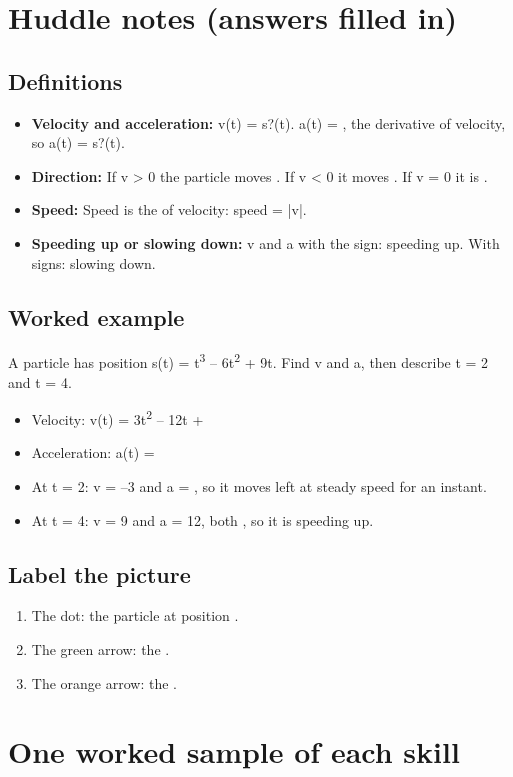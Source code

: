 \documentclass[11pt]{article}
\begin{document}
\section*{Huddle notes (answers filled in)}
\subsection*{Definitions}\begin{itemize}
\item \textbf{Velocity and acceleration:} v(t) = s?(t). a(t) = , the derivative of velocity, so a(t) = s?(t).
\item \textbf{Direction:} If v > 0 the particle moves . If v < 0 it moves . If v = 0 it is .
\item \textbf{Speed:} Speed is the  of velocity: speed = |v|.
\item \textbf{Speeding up or slowing down:} v and a with the  sign: speeding up. With  signs: slowing down.
\end{itemize}
\subsection*{Worked example}
A particle has position s(t) = t\textsuperscript{3} -- 6t\textsuperscript{2} + 9t. Find v and a, then describe t = 2 and t = 4.\\
\begin{itemize}
\item Velocity: v(t) = 3t\textsuperscript{2} -- 12t + 
\item Acceleration: a(t) = 
\item At t = 2: v = --3 and a = , so it moves left at steady speed for an instant.
\item At t = 4: v = 9 and a = 12, both , so it is speeding up.
\end{itemize}
\subsection*{Label the picture}
\begin{enumerate}
\item The dot: the particle at position .
\item The green arrow: the .
\item The orange arrow: the .
\end{enumerate}
\section*{One worked sample of each skill}
\end{document}
